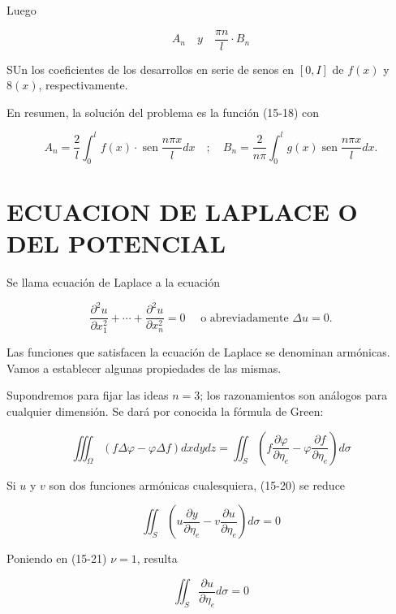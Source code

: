 \documentclass[10pt]{article}
\theoremstyle{plain}
\theoremstyle{definition}
\theoremstyle{remark}
\begin{document}
Luego

$$
A_{n} \quad y \quad \frac{\pi n}{l} \cdot B_{n}
$$

SUn los coeficientes de los desarrollos en serie de senos en $[0, I]$ de $f(x)$ y $8(x)$, respectivamente.

En resumen, la solución del problema es la función (15-18) con

$$
A_{n}=\frac{2}{l} \int_{0}^{l} f(x) \cdot \operatorname{sen} \frac{n \pi x}{l} d x \quad ; \quad B_{n}=\frac{2}{n \pi} \int_{0}^{l} g(x) \operatorname{sen} \frac{n \pi x}{l} d x .
$$

\section*{ECUACION DE LAPLACE O DEL POTENCIAL}
Se llama ecuación de Laplace a la ecuación


\begin{equation*}
\frac{\partial^{2} u}{\partial x_{1}^{2}}+\cdots+\frac{\partial^{2} u}{\partial x_{n}^{2}}=0 \quad \text { o abreviadamente } \Delta u=0 . \tag{15-19}
\end{equation*}


Las funciones que satisfacen la ecuación de Laplace se denominan armónicas. Vamos a establecer algunas propiedades de las mismas.

Supondremos para fijar las ideas $n=3$; los razonamientos son análogos para cualquier dimensión. Se dará por conocida la fórmula de Green:


\begin{equation*}
\iiint_{\Omega}(f \Delta \varphi-\varphi \Delta f) d x d y d z=\iint_{S}\left(f \frac{\partial \varphi}{\partial \eta_{e}}-\varphi \frac{\partial f}{\partial \eta_{e}}\right) d \sigma \tag{15-20}
\end{equation*}


Si $u$ y $v$ son dos funciones armónicas cualesquiera, (15-20) se reduce


\begin{equation*}
\iint_{S}\left(u \frac{\partial y}{\partial \eta_{e}}-v \frac{\partial u}{\partial \eta_{e}}\right) d \sigma=0 \tag{15-21}
\end{equation*}


Poniendo en (15-21) $\nu=1$, resulta


\begin{equation*}
\iint_{S} \frac{\partial u}{\partial \eta_{e}} d \sigma=0 \tag{15-22}
\end{equation*}
\end{document}
